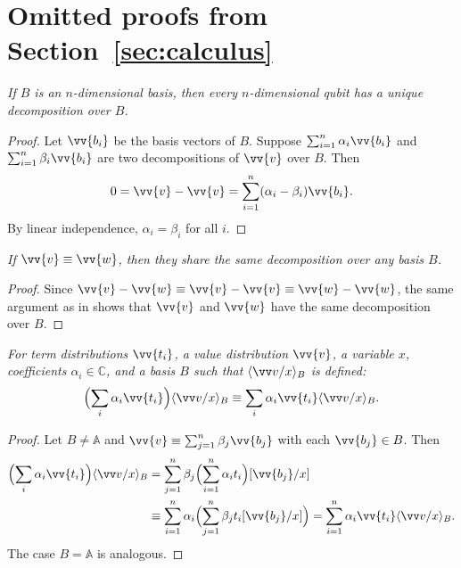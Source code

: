 \documentclass[runningheads,orivec,envcountsame,envcountsect]{llncs}
\newcommand\ansubst[2]{\ensuremath{\langle #1 \rangle_{#2}}}
\newcommand\AbsBasis{\ensuremath{\mathbb{A}}}
\def\C{\mathbb{C}}            %
\begin{document}
\section{Omitted proofs from Section~\ref{sec:calculus}}\label{sec:appendixA}

\begin{restatetheorem}
  \itshape
  If $B$ is an $n$-dimensional basis, then every $n$-dimensional qubit has
  a unique decomposition over $B$.
\end{restatetheorem}
\begin{proof}
  Let $\vv{b_i}$ be the basis vectors of $B$. Suppose
  $\sum_{i=1}^n \alpha_i \vv{b_i}$ and $\sum_{i=1}^n \beta_i \vv{b_i}$
  are two decompositions of $\vv{v}$ over $B$. Then
  \[
    0=\vv{v}-\vv{v}=\sum_{i=1}^{n}(\alpha_i-\beta_i)\vv{b_i}.
  \]
  By linear independence, $\alpha_i=\beta_i$ for all $i$.
\end{proof}

\begin{restatecorollary}
  \itshape
  If $\vv{v}\equiv\vv{w}$, then they share the same decomposition over any
  basis $B$.
\end{restatecorollary}
\begin{proof}
  Since $\vv{v}-\vv{w}\equiv\vv{v}-\vv{v}\equiv\vv{w}-\vv{w}$, the same
  argument as in  shows that $\vv{v}$ and $\vv{w}$ have the
  same decomposition over $B$.
\end{proof}

\begin{restatelemma}
  \itshape
  For term distributions $\vv{t_i}$, a value distribution $\vv{v}$, a
  variable $x$, coefficients $\alpha_i\in\C$, and a basis $B$ such that
  $\ansubst{\vv v/x}{B}$ is defined:
  \[
    \Bigl(\sum_i \alpha_i\vv{t_i}\Bigr)\ansubst{\vv v/x}{B}
    \equiv
    \sum_i \alpha_i\vv{t_i} \ansubst{\vv v/x}{B}.
  \]
\end{restatelemma}
\begin{proof}
  Let $B\neq\AbsBasis$ and
  $\vv{v}\equiv\sum_{j=1}^n\beta_j\vv{b_j}$ with each $\vv{b_j}\in B$.
  Then
  \begin{align*}
    \Bigl(\sum_i \alpha_i\vv{t_i}\Bigr)\ansubst{\vv v/x}{B}
    &= \sum_{j=1}^n \beta_j\Bigl(\sum_{i=1}^{n}\alpha_i t_i\Bigr)[\vv{b_j}/x]\\
    &\equiv \sum_{i=1}^{n}\alpha_i\Bigl(\sum_{j=1}^n\beta_j t_i[\vv{b_j}/x]\Bigr)
    = \sum_{i=1}^{n}\alpha_i\vv{t_i}\ansubst{\vv v/x}{B}.
  \end{align*}
  The case $B=\AbsBasis$ is analogous.
\end{proof}
\end{document}
